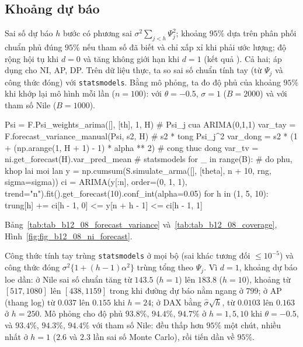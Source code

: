 \subsection{Khoảng dự báo}

 Sai số dự báo $h$ bước có phương sai $\sigma^2\sum_{j<h}\Psi_j^2$; khoảng $95\%$ dựa trên phân phối chuẩn phủ đúng $95\%$ nếu tham số đã biết và chỉ xấp xỉ khi phải ước lượng; độ rộng hội tụ khi $d=0$ và tăng không giới hạn khi $d=1$ (kết quả ).
 Cả hai; áp dụng cho NI, AP, DP. Trên dữ liệu thực, ta so sai số chuẩn tính tay (từ $\Psi_j$ và công thức đóng) với \texttt{statsmodels}. Bằng mô phỏng, ta đo độ phủ của khoảng $95\%$ khi khớp lại mô hình mỗi lần ($n=100$): với $\theta=-0.5$, $\sigma=1$ ($B=2000$) và với tham số Nile ($B=1000$).
\begin{codeblock}
Psi = F.Psi_weights_arima([], [th], 1, H)                      # Psi_j cua ARIMA(0,1,1)
var_tay = F.forecast_variance_manual(Psi, s2, H)               # s2 * tong Psi_j^2
var_dong = s2 * (1 + (np.arange(1, H + 1) - 1) * alpha ** 2)   # cong thuc dong
var_tv = ni.get_forecast(H).var_pred_mean                      # statsmodels
for _ in range(B):                                             # do phu, khop lai moi lan
    y = np.cumsum(S.simulate_arma([], [theta], n + 10, rng, sigma=sigma))
    ci = ARIMA(y[:n], order=(0, 1, 1), trend="n").fit().get_forecast(10).conf_int(alpha=0.05)
    for h in (1, 5, 10): trung[h] += ci[h - 1, 0] <= y[n + h - 1] <= ci[h - 1, 1]
\end{codeblock}
 Bảng~\ref{tab:tab_b12_08_forecast_variance} và~\ref{tab:tab_b12_08_coverage}, Hình~\ref{fig:fig_b12_08_ni_forecast}.


 Công thức tính tay trùng \texttt{statsmodels} ở mọi bộ (sai khác tương đối $\le10^{-5}$) và công thức đóng $\sigma^2\{1+(h-1)\alpha^2\}$ trùng tổng theo $\Psi_j$. Vì $d=1$, khoảng dự báo loe dần: ở Nile sai số chuẩn tăng từ $143.5$ ($h=1$) lên $183.8$ ($h=10$), khoảng từ $[517,1080]$ lên $[438,1159]$ trong khi đường dự báo nằm ngang ở $799$; ở AP (thang log) từ $0.037$ lên $0.155$ khi $h=24$; ở DAX bằng $\hat\sigma\sqrt h$, từ $0.0103$ lên $0.163$ ở $h=250$. Mô phỏng cho độ phủ $93.8\%$, $94.4\%$, $94.7\%$ ở $h=1,5,10$ khi $\theta=-0.5$, và $93.4\%$, $94.3\%$, $94.4\%$ với tham số Nile: đều thấp hơn $95\%$ một chút, nhiều nhất ở $h=1$ ($2.6$ và $2.3$ lần sai số Monte Carlo), rồi tiến dần về $95\%$.


